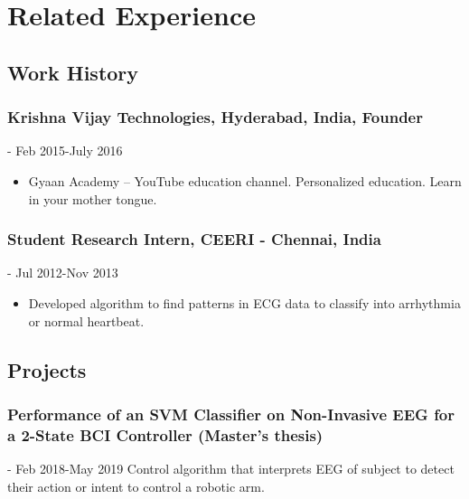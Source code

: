 \documentclass{article}
\begin{document}
\section{Related Experience}
\subsection{Work History}

\subsubsection{Krishna Vijay Technologies, Hyderabad, India, Founder} - Feb 2015-July 2016
\begin{itemize}
    \item Gyaan Academy -- YouTube education channel. Personalized education. Learn in your mother tongue.
\end{itemize}
    
\subsubsection{Student Research Intern, CEERI - Chennai, India} - Jul 2012-Nov 2013
\begin{itemize}
    \item Developed algorithm to find patterns in ECG data to classify into arrhythmia or normal heartbeat.
\end{itemize}


\subsection{Projects}
\subsubsection{Performance of an SVM Classifier on Non-Invasive EEG for a 2-State BCI Controller (Master's thesis)} - Feb 2018-May 2019
\noindent
Control algorithm that interprets EEG of subject to detect their action or intent to control a robotic arm.
\end{document}
